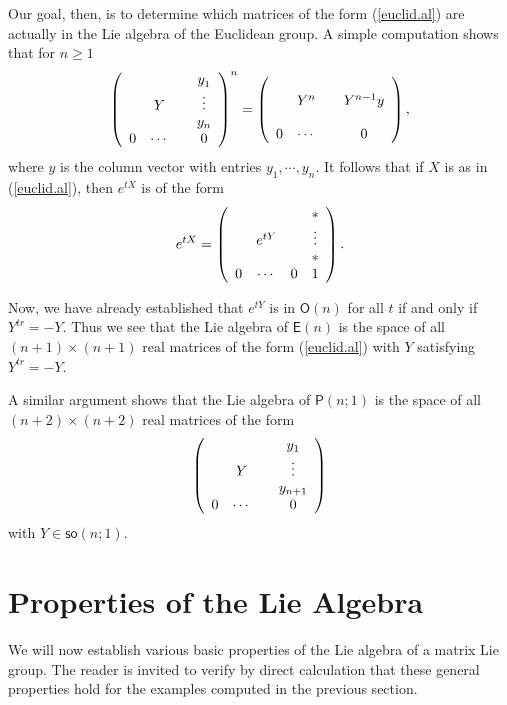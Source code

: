 \documentclass[12pt]{amsbook}
\theoremstyle{plain}
\numberwithin{equation}{chapter}
\numberwithin{theorem}{chapter}
\begin{document}
Our goal, then, is to determine which matrices of the form (\ref{euclid.al})
are actually in the Lie algebra of the Euclidean group. A simple computation
shows that for $n\geq1$
\[
\left(
\begin{array}
[c]{cccc}%
&  &  & y_{1}^{{}}\\
& Y &  & \vdots\\
&  &  &  y_{n}\\
0 & \cdots &  & 0
\end{array}
\right)  ^{n}=\left(
\begin{array}
[c]{cccc}%
&  &  & \\
& Y^{n} &  & Y^{n-1}y\\
&  &  & \\
0 & \cdots &  & 0
\end{array}
\right)  ,
\]
where $y$ is the column vector with entries $y_{1},\cdots,y_{n}.$ It follows
that if $X$ is as in (\ref{euclid.al}), then $e^{tX}$ is of the form
\[
e^{tX}=\left(
\begin{array}
[c]{cccc}%
&  &  & \ast\\
&  e^{tY} &  & \vdots\\
&  &  & \ast\\
0 & \cdots & 0 & 1
\end{array}
\right)  \text{.}%
\]

Now, we have already established that $e^{tY}$ is in $\mathsf{O}(n)$ for all
$t$ if and only if $Y^{tr}=-Y$. Thus we see that the Lie algebra of
$\mathsf{E}(n)$ is the space of all $(n+1)\times(n+1)$ real matrices of the
form (\ref{euclid.al}) with $Y$ satisfying $Y^{tr}=-Y$.

A similar argument shows that the Lie algebra of $\mathsf{P}(n;1)$ is the
space of all $(n+2)\times(n+2)$ real matrices of the form
\[
\left(
\begin{array}
[c]{cccc}%
&  &  & y_{1}\\
& Y &  & \vdots\\
&  &  &  y_{n+1}\\
0 & \cdots &  & 0
\end{array}
\right)
\]
with $Y\in\mathsf{so}(n;1)$.

\section{Properties of the Lie Algebra}

We will now establish various basic properties of the Lie algebra of a matrix
Lie group. The reader is invited to verify by direct calculation that these
general properties hold for the examples computed in the previous section.
\end{document}
